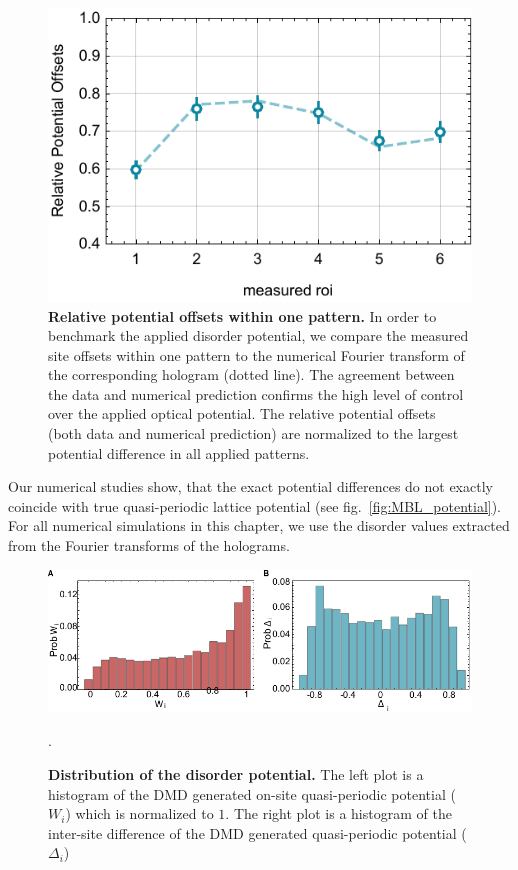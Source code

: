 \begin{figure}[t]
	\centering
	\includegraphics{figures/MBL_disorder_cal_roi.pdf}
	\caption{\label{fig:MBL_Wcal} \textbf {Relative potential offsets within one pattern.} In order to benchmark the applied disorder potential, we compare the measured site offsets within one pattern to the numerical Fourier transform of the corresponding hologram (dotted line). The agreement between the data and numerical prediction confirms the high level of control over the applied optical potential. The relative potential offsets (both data and numerical prediction) are normalized to the largest potential difference in all applied patterns.}
\end{figure}

Our numerical studies show, that the exact potential differences do not exactly coincide with true quasi-periodic lattice potential (see fig.~\ref{fig:MBL_potential}). For all numerical simulations in this chapter, we use the disorder values extracted from the Fourier transforms of the holograms.

\begin{figure}[t]
	\centering
	\includegraphics[width=140mm]{figures/MBL_dists_combo.pdf}
	\caption{\label{fig:DistRow} {\bf Distribution of the disorder potential.}  The left plot is a histogram of the DMD generated on-site quasi-periodic potential ($W_i$) which is normalized to $1$. The right plot is a histogram of the inter-site difference of the DMD generated quasi-periodic potential ($\Delta_i$)  }.
\end{figure}

